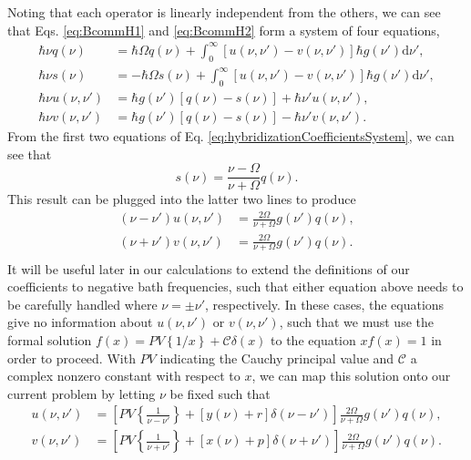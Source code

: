 Noting that each operator is linearly independent from the others, we can see that Eqs. \eqref{eq:BcommH1} and \eqref{eq:BcommH2} form a system of four equations,
\begin{equation}\label{eq:hybridizationCoefficientsSystem}
\begin{split}
\hbar\nu q(\nu) &= \hbar\Omega q(\nu) + \int_0^\infty\left[u(\nu,\nu') - v(\nu,\nu')\right]\hbar g(\nu')\mathrm{d}\nu',\\
\hbar\nu s(\nu) &= -\hbar\Omega s(\nu) + \int_0^\infty\left[u(\nu,\nu') - v(\nu,\nu')\right]\hbar g(\nu')\mathrm{d}\nu',\\
\hbar\nu u(\nu,\nu') &= \hbar g(\nu')[q(\nu) - s(\nu)] + \hbar\nu'u(\nu,\nu'),\\
\hbar\nu v(\nu,\nu') &= \hbar g(\nu')[q(\nu) - s(\nu)] - \hbar\nu'v(\nu,\nu').
\end{split}
\end{equation}
From the first two equations of Eq. \eqref{eq:hybridizationCoefficientsSystem}, we can see that
\begin{equation}
s(\nu) = \frac{\nu - \Omega}{\nu + \Omega}q(\nu).
\end{equation}
This result can be plugged into the latter two lines to produce
\begin{equation}
\begin{split}
(\nu - \nu')u(\nu,\nu') &= \frac{2\Omega}{\nu + \Omega} g(\nu')q(\nu),\\
(\nu + \nu')v(\nu,\nu') &= \frac{2\Omega}{\nu + \Omega} g(\nu')q(\nu).\\
\end{split}
\end{equation}
It will be useful later in our calculations to extend the definitions of our coefficients to negative bath frequencies, such that either equation above needs to be carefully handled where $\nu = \pm\nu'$, respectively. In these cases, the equations give no information about $u(\nu,\nu')$ or $v(\nu,\nu')$, such that we must use the formal solution $f(x) = PV\left\{1/x\right\} + \mathcal{C}\delta(x)$ to the equation $xf(x) = 1$ in order to proceed. With $PV$ indicating the Cauchy principal value and $\mathcal{C}$ a complex nonzero constant with respect to $x$, we can map this solution onto our current problem by letting $\nu$ be fixed such that 
\begin{equation}
\begin{split}
u(\nu,\nu') &= \left[PV\left\{\frac{1}{\nu - \nu'}\right\} + [y(\nu) + r]\delta(\nu - \nu')\right]\frac{2\Omega}{\nu + \Omega}g(\nu')q(\nu),\\
v(\nu,\nu') &= \left[PV\left\{\frac{1}{\nu + \nu'}\right\} + [x(\nu) + p]\delta(\nu + \nu')\right]\frac{2\Omega}{\nu + \Omega}g(\nu')q(\nu).
\end{split}
\end{equation}
